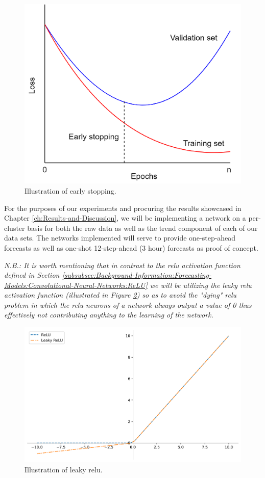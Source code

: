 \begin{figure}[H]
    \centering
    \includegraphics[width=\textwidth]{Images/Chapter 6/Stage 4/Other/Early-Stopping.pdf}
    \caption{Illustration of early stopping.}
    \label{fig:Early-Stopping}
\end{figure}

\noindent \newline For the purposes of our experiments and procuring the results showcased in Chapter \ref{ch:Results-and-Discussion}, we will be implementing a network on a per-cluster basis for both the raw data as well as the trend component of each of our data sets. The networks implemented will serve to provide one-step-ahead forecasts as well as one-shot 12-step-ahead (3 hour) forecasts as proof of concept.

\noindent \newline \textit{N.B.: It is worth mentioning that in contrast to the \gls{relu} activation function defined in Section \ref{subsubsec:Background-Information:Forecasting-Models:Convolutional-Neural-Networks:ReLU} we will be utilizing the leaky \gls{relu} activation function (illustrated in Figure \ref{fig:Leaky-ReLU}) so as to avoid the "dying" \gls{relu} problem in which the \gls{relu} neurons of a network always output a value of 0 thus effectively not contributing anything to the learning of the network.}

\begin{figure}[H]
    \centering
    \includegraphics[width=\textwidth]{Images/Chapter 6/Stage 4/Other/Leaky-ReLU.pdf}
    \caption{Illustration of leaky \gls{relu}.}
    \label{fig:Leaky-ReLU}
\end{figure}